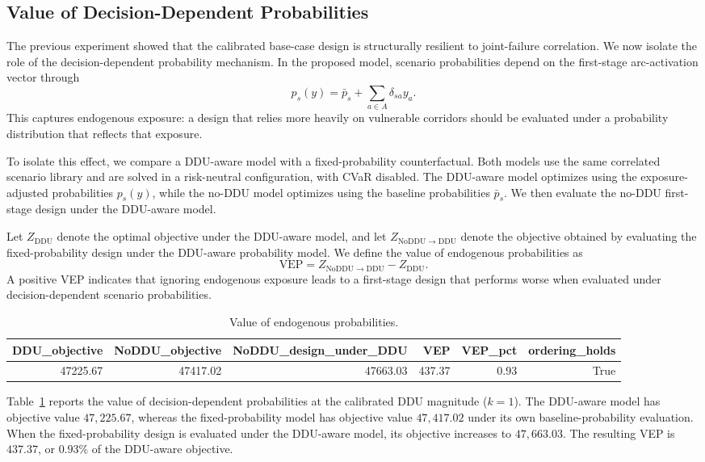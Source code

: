 \documentclass[final,3p,authoryear]{elsarticle}
\theoremstyle{definition}
\begin{document}
\subsection{Value of Decision-Dependent Probabilities}
\label{sec:vep}
 
The previous experiment showed that the calibrated base-case design is
structurally resilient to joint-failure correlation. We now isolate the
role of the decision-dependent probability mechanism. In the proposed
model, scenario probabilities depend on the first-stage arc-activation
vector through
\[
p_s(y)=\bar p_s+\sum_{a\in A}\delta_{sa}y_a.
\]
This captures endogenous exposure: a design that relies more heavily on
vulnerable corridors should be evaluated under a probability
distribution that reflects that exposure.
 
To isolate this effect, we compare a DDU-aware model with a
fixed-probability counterfactual. Both models use the same correlated
scenario library and are solved in a risk-neutral configuration, with
CVaR disabled. The DDU-aware model optimizes using the exposure-adjusted
probabilities \(p_s(y)\), while the no-DDU model optimizes using the
baseline probabilities \(\bar p_s\). We then evaluate the no-DDU
first-stage design under the DDU-aware model.
 
Let \(Z_{\mathrm{DDU}}\) denote the optimal objective under the
DDU-aware model, and let \(Z_{\mathrm{NoDDU}\rightarrow\mathrm{DDU}}\)
denote the objective obtained by evaluating the fixed-probability
design under the DDU-aware probability model. We define the value of
endogenous probabilities as
\[
\mathrm{VEP}
=
Z_{\mathrm{NoDDU}\rightarrow\mathrm{DDU}}
-
Z_{\mathrm{DDU}}.
\]
A positive VEP indicates that ignoring endogenous exposure leads to a
first-stage design that performs worse when evaluated under
decision-dependent scenario probabilities.
 
\begin{table}
\caption{Value of endogenous probabilities.}
\label{tab:tab04_vdu}
\begin{tabular}{rrrrrr}
\toprule
DDU\_objective & NoDDU\_objective & NoDDU\_design\_under\_DDU & VEP & VEP\_pct & ordering\_holds \\
\midrule
47225.67 & 47417.02 & 47663.03 & 437.37 & 0.93 & True \\
\bottomrule
\end{tabular}
\end{table}

 
Table~\ref{tab:tab04_vdu} reports the value of decision-dependent
probabilities at the calibrated DDU magnitude (\(k=1\)). The DDU-aware
model has objective value \(47{,}225.67\), whereas the fixed-probability
model has objective value \(47{,}417.02\) under its own
baseline-probability evaluation. When the fixed-probability design is
evaluated under the DDU-aware model, its objective increases to
\(47{,}663.03\). The resulting VEP is \(437.37\), or \(0.93\%\) of the
DDU-aware objective.
 
\end{document}
